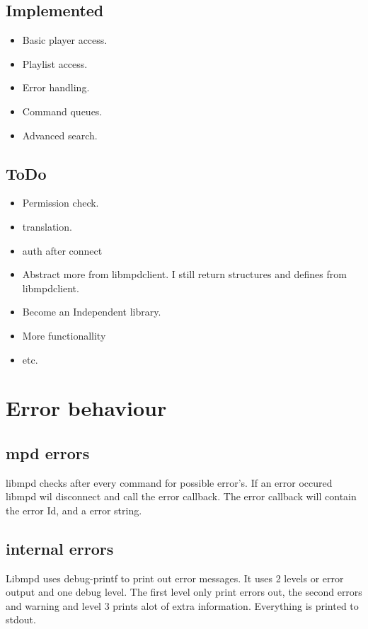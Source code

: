 \documentclass[a4paper,11pt]{article}
\begin{document}
\subsection{Implemented}

\begin{itemize}
  \item Basic player access.
  
  \item Playlist access.
  
  \item Error handling.
  
  \item Command queues.
  
  \item Advanced search.
\end{itemize}

\subsection{ToDo}
\begin{itemize}
  \item Permission check.
  
  \item translation.
  
  \item auth after connect
  
  \item Abstract more from libmpdclient. I still return structures and defines
  from libmpdclient.
  
  \item Become an Independent  library.
  
  \item More functionallity
  
  \item etc.
\end{itemize}


\section{Error behaviour}
\subsection{mpd errors}
libmpd checks after every command for possible error's. If an error occured
libmpd wil disconnect and call the error callback. The error callback will
contain the error Id, and a error string.
\subsection {internal errors}
Libmpd uses debug-printf to print out error messages. It uses 2 levels or error output and one debug level.
The first level only print errors out, the second errors and warning and level 3 prints alot of extra information.
Everything is printed to stdout.
\end{document}
